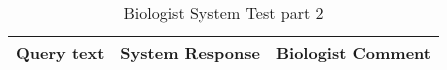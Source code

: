 \begin{table*}[h!]
  \footnotesize
  \centering
  \begin{tabular}{|p{}|p{}|p{}|}
    \hline
    {\Large \textbf{Query text}} & {\Large \textbf{System Response}} & {\Large \textbf{Biologist Comment}} \\
    \hline
    \hline
  \end{tabular}
  \normalsize
  \caption{Biologist System Test part 2}
  \label{tab:rupertsfeedbackp2}
\end{table*}

\begin{comment}
    \cyan{What is the NCBI GeneID four mouse ATf3?} & \violet{The NCBI GeneID for mouse Atf3 is ENSMUSG00000027109.} & \brown{\textit{Close, but no cigar. We got a gene ID for a mouse transcription factor, but that's all. ENSMUSG00000027109 is mouse Sp3.}}    \\
    \hline
    \cyan{What is the ENSEMBL GeneID for mouse Atf3?} & \violet{The ENSEMBL GeneID for mouse Atf3 is ENSMUSG00000064371.} & \brown{\textit{Nope, this is mitochondrial tRNA threonine. I wasn’t expecting much from this query as we know this is NOT what LLMs do well. Maybe there could be re-training on the NCBI/Uniprot descriptions and even GeneRIF. I still think there should be a way to directly link entities to databases though.}} \\
    \hline
    \cyan{What is the ENSEMBL identifier for Atf3 in mice?} & \violet{The ENSEMBL identifier for Atf3 in mice is ENSMUSG00000027109.} & \brown{\textit{Rephrasing the question gives qualitatively different answers. The citations are all kind of sane though. They actually do get close to Atf3 and the IDs appear to be drawn from these sources. Some explicit grounding would nail this down I think.}} \\
    \hline
    \cyan{What is the role of Atf3 in the brain?} & \violet{Atf3 is a transcriptional activator that binds to the cAMP-responsive element (Cre). Interaction with Jun redirects Jun to bind to Cres preferentially over the 12-Otetradecanoylphorbol-13-acetate response elements (Tres) as part of an Atf2-c-Jun complex (487 aa). However, human study did not show strong support for the association between ATF2 and alcoholism. Alcoholism is particularly influenced by the environment.} & \brown{\textit{The response seemed to come only from individual studies rather than being a summary of the field. That may be due to the small post-training dataset at this stage. Is there a 'relevance score' for the papers returned? Several references (and part of the response) were based on Atf2. This is a different gene. Does the system perform grounding to biomedical ontologies? Or is it just looking at text similarity (like Levenshtein distance)?}} \\

\end{comment}
